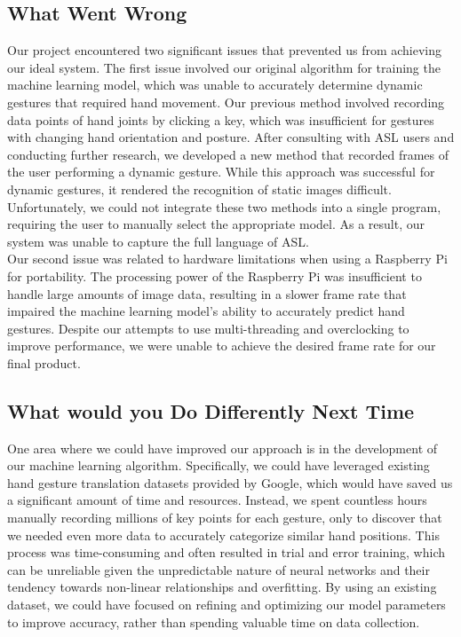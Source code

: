 \documentclass[12pt, titlepage]{article}
\begin{document}
\subsection{What Went Wrong}
Our project encountered two significant issues that prevented us from achieving our ideal system. The first issue involved our original algorithm for training the machine learning model, which was unable to accurately determine dynamic gestures that required hand movement. Our previous method involved recording data points of hand joints by clicking a key, which was insufficient for gestures with changing hand orientation and posture. After consulting with ASL users and conducting further research, we developed a new method that recorded frames of the user performing a dynamic gesture. While this approach was successful for dynamic gestures, it rendered the recognition of static images difficult. Unfortunately, we could not integrate these two methods into a single program, requiring the user to manually select the appropriate model. As a result, our system was unable to capture the full language of ASL.\\

\noindent Our second issue was related to hardware limitations when using a Raspberry Pi for portability. The processing power of the Raspberry Pi was insufficient to handle large amounts of image data, resulting in a slower frame rate that impaired the machine learning model's ability to accurately predict hand gestures. Despite our attempts to use multi-threading and overclocking to improve performance, we were unable to achieve the desired frame rate for our final product.\\

\subsection{What would you Do Differently Next Time}

One area where we could have improved our approach is in the development of our machine learning algorithm. Specifically, we could have leveraged existing hand gesture translation datasets provided by Google, which would have saved us a significant amount of time and resources. Instead, we spent countless hours manually recording millions of key points for each gesture, only to discover that we needed even more data to accurately categorize similar hand positions. This process was time-consuming and often resulted in trial and error training, which can be unreliable given the unpredictable nature of neural networks and their tendency towards non-linear relationships and overfitting. By using an existing dataset, we could have focused on refining and optimizing our model parameters to improve accuracy, rather than spending valuable time on data collection.\\
\end{document}
